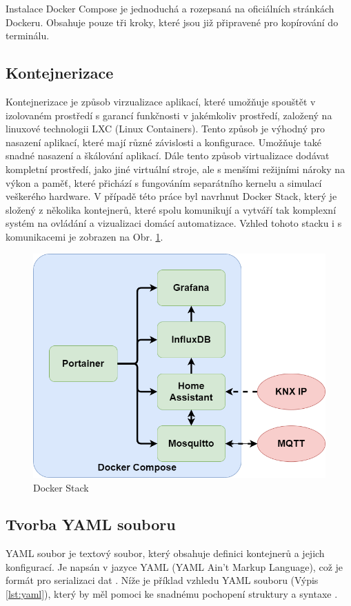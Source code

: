 Instalace Docker Compose je jednoduchá a rozepsaná na oficiálních stránkách Dockeru. Obsahuje pouze tři kroky, které jsou již připravené pro kopírování do terminálu. \cite{DockerInstallationForDebian}

\subsection{Kontejnerizace}
Kontejnerizace je způsob virzualizace aplikací, které umožňuje spouštět v izolovaném prostředí s garancí funkčnosti v jakémkoliv prostředí, založený na linuxové technologii LXC (Linux Containers). Tento způsob je výhodný pro nasazení aplikací, které mají různé závislosti a konfigurace. Umožňuje také snadné nasazení a škálování aplikací. Dále tento způsob virtualizace dodávat kompletní prostředí, jako jiné virtuální stroje, ale s menšími režijními nároky na výkon a paměť, které přichází s fungováním separátního kernelu a simulací veškerého hardware. \cite{ContainerAndVirtualization}
V případě této práce byl navrhnut Docker Stack, který je složený z několika kontejnerů, které spolu komunikují a vytváří tak komplexní systém na ovládání a vizualizaci domácí automatizace. Vzhled tohoto stacku i s komunikacemi je zobrazen na Obr. \ref{fig:DockerStack}.
\begin{figure}[!ht]
    \begin{center}
        \includegraphics[scale=0.30]{obrazky/stack.png}
    \end{center}
    \caption[Docker Stack]{Docker Stack }
    \label{fig:DockerStack}
\end{figure}
\subsection{Tvorba YAML souboru}
YAML soubor je textový soubor, který obsahuje definici kontejnerů a jejich konfigurací. Je napsán v jazyce YAML (YAML Ain't Markup Language), což je formát pro serializaci dat \cite{YAML}. Níže je příklad vzhledu YAML souboru (Výpis \ref{lst:yaml}), který by měl pomoci ke snadnému pochopení struktury a syntaxe \cite{ComposeYamlExample}.

